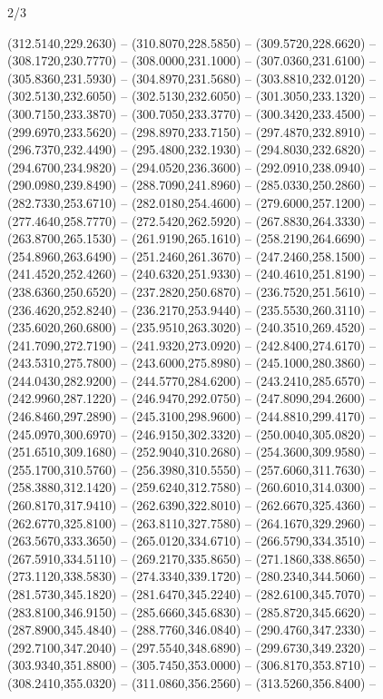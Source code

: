 \begin{flagdescription}{2/3}
\begin{scope}[xshift=0.5\flaglength]
\begin{scope}[scale=0.00209\flagwidth,yshift=170mm,xshift=-360]
\begin{scope}[y=-0.8pt, x=0.8pt, inner sep=0pt, outer sep=0pt]
  (312.5140,229.2630) -- (310.8070,228.5850) -- (309.5720,228.6620) --
  (308.1720,230.7770) -- (308.0000,231.1000) -- (307.0360,231.6100) --
  (305.8360,231.5930) -- (304.8970,231.5680) -- (303.8810,232.0120) --
  (302.5130,232.6050) -- (302.5130,232.6050) -- (301.3050,233.1320) --
  (300.7150,233.3870) -- (300.7050,233.3770) -- (300.3420,233.4500) --
  (299.6970,233.5620) -- (298.8970,233.7150) -- (297.4870,232.8910) --
  (296.7370,232.4490) -- (295.4800,232.1930) -- (294.8030,232.6820) --
  (294.6700,234.9820) -- (294.0520,236.3600) -- (292.0910,238.0940) --
  (290.0980,239.8490) -- (288.7090,241.8960) -- (285.0330,250.2860) --
  (282.7330,253.6710) -- (282.0180,254.4600) -- (279.6000,257.1200) --
  (277.4640,258.7770) -- (272.5420,262.5920) -- (267.8830,264.3330) --
  (263.8700,265.1530) -- (261.9190,265.1610) -- (258.2190,264.6690) --
  (254.8960,263.6490) -- (251.2460,261.3670) -- (247.2460,258.1500) --
  (241.4520,252.4260) -- (240.6320,251.9330) -- (240.4610,251.8190) --
  (238.6360,250.6520) -- (237.2820,250.6870) -- (236.7520,251.5610) --
  (236.4620,252.8240) -- (236.2170,253.9440) -- (235.5530,260.3110) --
  (235.6020,260.6800) -- (235.9510,263.3020) -- (240.3510,269.4520) --
  (241.7090,272.7190) -- (241.9320,273.0920) -- (242.8400,274.6170) --
  (243.5310,275.7800) -- (243.6000,275.8980) -- (245.1000,280.3860) --
  (244.0430,282.9200) -- (244.5770,284.6200) -- (243.2410,285.6570) --
  (242.9960,287.1220) -- (246.9470,292.0750) -- (247.8090,294.2600) --
  (246.8460,297.2890) -- (245.3100,298.9600) -- (244.8810,299.4170) --
  (245.0970,300.6970) -- (246.9150,302.3320) -- (250.0040,305.0820) --
  (251.6510,309.1680) -- (252.9040,310.2680) -- (254.3600,309.9580) --
  (255.1700,310.5760) -- (256.3980,310.5550) -- (257.6060,311.7630) --
  (258.3880,312.1420) -- (259.6240,312.7580) -- (260.6010,314.0300) --
  (260.8170,317.9410) -- (262.6390,322.8010) -- (262.6670,325.4360) --
  (262.6770,325.8100) -- (263.8110,327.7580) -- (264.1670,329.2960) --
  (263.5670,333.3650) -- (265.0120,334.6710) -- (266.5790,334.3510) --
  (267.5910,334.5110) -- (269.2170,335.8650) -- (271.1860,338.8650) --
  (273.1120,338.5830) -- (274.3340,339.1720) -- (280.2340,344.5060) --
  (281.5730,345.1820) -- (281.6470,345.2240) -- (282.6100,345.7070) --
  (283.8100,346.9150) -- (285.6660,345.6830) -- (285.8720,345.6620) --
  (287.8900,345.4840) -- (288.7760,346.0840) -- (290.4760,347.2330) --
  (292.7100,347.2040) -- (297.5540,348.6890) -- (299.6730,349.2320) --
  (303.9340,351.8800) -- (305.7450,353.0000) -- (306.8170,353.8710) --
  (308.2410,355.0320) -- (311.0860,356.2560) -- (313.5260,356.8400) --

\end{scope}
\end{scope}
\end{scope}
\end{flagdescription}
